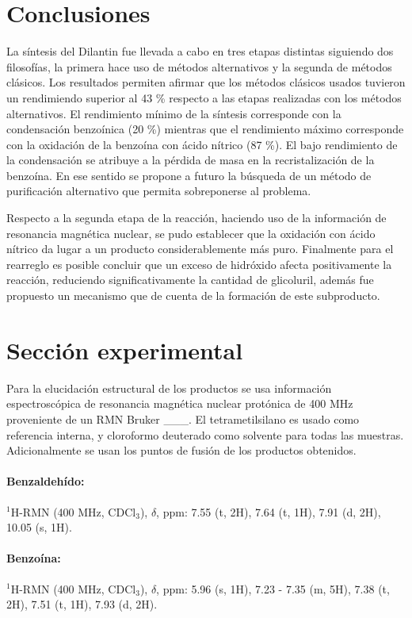 \documentclass[fleqn,10pt]{SelfArx}
\begin{document}
\section{Conclusiones}
La s\'intesis del Dilantin fue llevada a cabo en tres etapas distintas siguiendo dos filosof\'ias, la primera hace uso de m\'etodos alternativos y la segunda de m\'etodos cl\'asicos. Los resultados permiten afirmar que los m\'etodos cl\'asicos usados tuvieron un rendimiendo superior al 43 \% respecto a las etapas realizadas con los m\'etodos alternativos. El rendimiento m\'inimo de la s\'intesis corresponde con la condensaci\'on benzo\'inica (20 \%) mientras que el rendimiento m\'aximo corresponde con la oxidaci\'on de la benzo\'ina con \'acido n\'itrico (87 \%). El bajo rendimiento de la condensaci\'on se atribuye a la p\'erdida de masa en la recristalizaci\'on de la benzo\'ina. En ese sentido se propone a futuro la b\'usqueda de un m\'etodo de purificaci\'on alternativo que permita sobreponerse al problema.

Respecto a la segunda etapa de la reacci\'on, haciendo uso de la informaci\'on de resonancia magn\'etica nuclear, se pudo establecer que la oxidaci\'on con \'acido n\'itrico da lugar a un producto considerablemente m\'as puro. Finalmente para el rearreglo es posible concluir que un exceso de hidr\'oxido afecta positivamente la reacci\'on, reduciendo significativamente la cantidad de glicoluril, adem\'as fue propuesto un mecanismo que de cuenta de la formaci\'on de este subproducto.
\newpage

\section{Secci\'on experimental}
Para la elucidaci\'on estructural de los productos se usa informaci\'on espectrosc\'opica de resonancia magn\'etica nuclear prot\'onica de 400 MHz proveniente de un RMN Bruker \_\_\_. El tetrametilsilano es usado como referencia interna, y cloroformo deuterado como solvente para todas las muestras. Adicionalmente se usan los puntos de fusi\'on de los productos obtenidos.
\paragraph{Benzaldehído:} $^1$H-RMN (400 MHz, CDCl$_3$), $\delta$, ppm: 7.55 (t, 2H), 7.64 (t, 1H), 7.91 (d, 2H), 10.05 (s, 1H).

\paragraph{Benzo\'ina:} $^1$H-RMN (400 MHz, CDCl$_3$), $\delta$, ppm: 5.96 (s, 1H), 7.23 - 7.35 (m, 5H), 7.38 (t, 2H), 7.51 (t, 1H), 7.93 (d, 2H).
\end{document}
